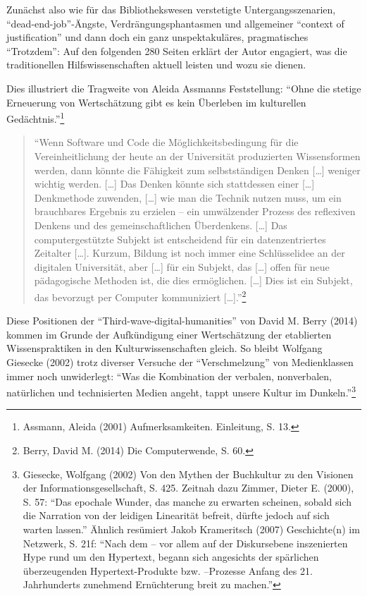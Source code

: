 \documentclass[a4paper,
fontsize=11pt,
oneside,
numbers=noperiodatend,
parskip=half-,
bibliography=totoc,
final
]{scrartcl}
\begin{document}
Zunächst also wie für das Bibliothekswesen verstetigte
Untergangsszenarien, \enquote{dead-end-job}-Ängste,
Verdrängungsphantasmen und allgemeiner \enquote{context of
justification} und dann doch ein ganz unspektakuläres, pragmatisches
\enquote{Trotzdem}: Auf den folgenden 280 Seiten erklärt der Autor
engagiert, was die traditionellen Hilfswissenschaften aktuell leisten
und wozu sie dienen.

Dies illustriert die Tragweite von Aleida Assmanns Feststellung:
\enquote{Ohne die stetige Erneuerung von Wertschätzung gibt es kein
Überleben im kulturellen Gedächtnis.}\footnote{Assmann, Aleida (2001)
  Aufmerksamkeiten. Einleitung, S. 13.}

\begin{quote}
\enquote{Wenn Software und Code die Möglichkeitsbedingung für die
Vereinheitlichung der heute an der Universität produzierten
Wissensformen werden, dann könnte die Fähigkeit zum selbstständigen
Denken {[}\ldots{}{]} weniger wichtig werden. {[}\ldots{}{]} Das Denken
könnte sich stattdessen einer {[}\ldots{}{]} Denkmethode zuwenden,
{[}\ldots{}{]} wie man die Technik nutzen muss, um ein brauchbares
Ergebnis zu erzielen -- ein umwälzender Prozess des reflexiven Denkens
und des gemeinschaftlichen Überdenkens. {[}\ldots{}{]} Das
computergestützte Subjekt ist entscheidend für ein datenzentriertes
Zeitalter {[}\ldots{}{]}. Kurzum, Bildung ist noch immer eine
Schlüsselidee an der digitalen Universität, aber {[}\ldots{}{]} für ein
Subjekt, das {[}\ldots{}{]} offen für neue pädagogische Methoden ist,
die dies ermöglichen. {[}\ldots{}{]} Dies ist ein Subjekt, das bevorzugt
per Computer kommuniziert {[}\ldots{}{]}.}\footnote{Berry, David M.
  (2014) Die Computerwende, S. 60.}
\end{quote}

Diese Positionen der \enquote{Third-wave-digital-humanities} von David
M. Berry (2014) kommen im Grunde der Aufkündigung einer Wertschätzung
der etablierten Wissenspraktiken in den Kulturwissenschaften gleich. So
bleibt Wolfgang Giesecke (2002) trotz diverser Versuche der
\enquote{Verschmelzung} von Medienklassen immer noch unwiderlegt:
\enquote{Was die Kombination der verbalen, nonverbalen, natürlichen und
technisierten Medien angeht, tappt unsere Kultur im Dunkeln.}\footnote{Giesecke,
  Wolfgang (2002) Von den Mythen der Buchkultur zu den Visionen der
  Informationsgesellschaft, S. 425. Zeitnah dazu Zimmer, Dieter E.
  (2000), S. 57: \enquote{Das epochale Wunder, das manche zu erwarten
  scheinen, sobald sich die Narration von der leidigen Linearität
  befreit, dürfte jedoch auf sich warten lassen.} Ähnlich resümiert
  Jakob Krameritsch (2007) Geschichte(n) im Netzwerk, S. 21f:
  \enquote{Nach dem -- vor allem auf der Diskursebene inszenierten Hype
  rund um den Hypertext, begann sich angesichts der spärlichen
  überzeugenden Hypertext-Produkte bzw. --Prozesse Anfang des 21.
  Jahrhunderts zunehmend Ernüchterung breit zu machen.}}
\end{document}
